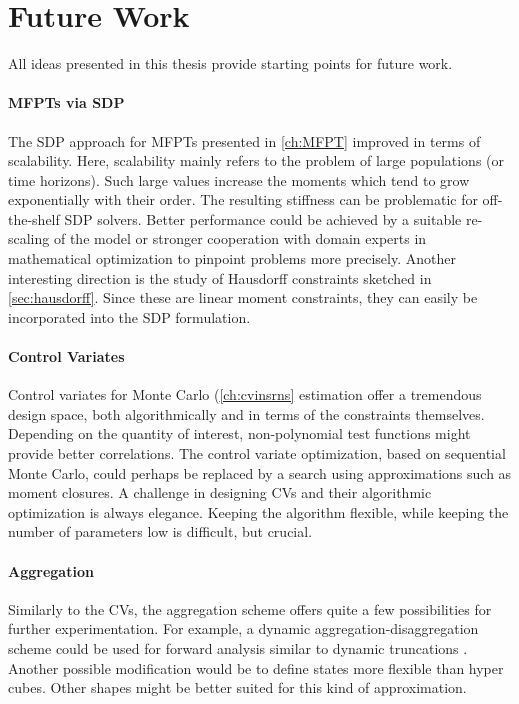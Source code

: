 \section{Future Work}
All ideas presented in this thesis provide starting points for future work.

\paragraph{{MFPTs} via {SDP}}
The \ac{SDP} approach for \acp{MFPT} presented in \autoref{ch:MFPT} improved in terms of scalability.
Here, scalability mainly refers to the problem of large populations (or time horizons).
Such large values increase the moments which tend to grow exponentially with their order.
The resulting stiffness can be problematic for off-the-shelf \ac{SDP} solvers.
Better performance could be achieved by a suitable re-scaling of the model or stronger cooperation with domain experts in mathematical optimization to pinpoint problems more precisely.
Another interesting direction is the study of Hausdorff constraints sketched in \autoref{sec:hausdorff}.
Since these are linear moment constraints, they can easily be incorporated into the \ac{SDP} formulation.

\paragraph{Control Variates}
Control variates for Monte Carlo (\autoref{ch:cvinsrns} estimation offer a tremendous design space, both algorithmically and in terms of the constraints themselves.
Depending on the quantity of interest, non-polynomial test functions might provide better correlations.
The control variate optimization, based on sequential Monte Carlo, could perhaps be replaced by a search using approximations such as moment closures.
A challenge in designing \acp{CV} and their algorithmic optimization is always elegance.
Keeping the algorithm flexible, while keeping the number of parameters low is difficult, but crucial.

\paragraph{Aggregation}
Similarly to the \aclp{CV}, the aggregation scheme offers quite a few possibilities for further experimentation.
For example, a dynamic aggregation-disaggregation scheme could be used for forward analysis similar to dynamic truncations \parencite{andreychenko2011parameter}.
Another possible modification would be to define states more flexible than hyper cubes.
Other shapes might be better suited for this kind of approximation.

